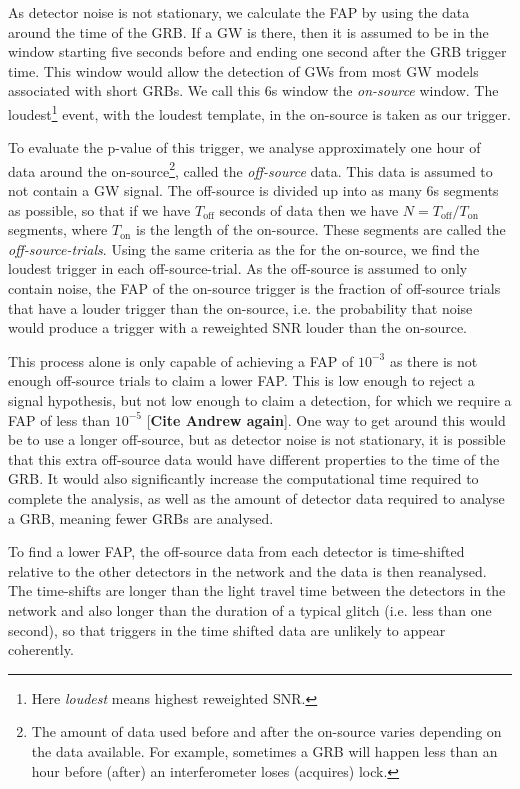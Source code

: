 \documentclass[11pt]{cuthesis}
\begin{document}
As detector noise is not stationary, we calculate the FAP by using the data around the time of the GRB. If a GW is there, then it is assumed to be in the window starting five seconds before and ending one second after the GRB trigger time. This window would allow the detection of GWs from most GW models associated with short GRBs. We call this 6s window the \textit{on-source} window. The loudest\footnote{Here \textit{loudest} means highest reweighted SNR.} event, with the loudest template, in the on-source is taken as our trigger. 

To evaluate the p-value of this trigger, we analyse approximately one hour of data around the on-source\footnote{The amount of data used before and after the on-source varies depending on the data available. For example, sometimes a GRB will happen less than an hour before (after) an interferometer loses (acquires) lock.}, called the \textit{off-source} data. This data is assumed to not contain a GW signal. The off-source is divided up into as many 6s segments as possible, so that if we have $T_\text{off}$ seconds of data then we have $N=T_\text{off} / T_\text{on}$ segments, where $T_\text{on}$ is the length of the on-source. These segments are called the \textit{off-source-trials}. Using the same criteria as the for the on-source, we find the loudest trigger in each off-source-trial. As the off-source is assumed to only contain noise, the FAP of the on-source trigger is the fraction of off-source trials that have a louder trigger than the on-source, i.e. the probability that noise would produce a trigger with a reweighted SNR louder than the on-source. 

This process alone is only capable of achieving a FAP of $10^{-3}$ as there is not enough off-source trials to claim a lower FAP. This is low enough to reject a signal hypothesis, but not low enough to claim a detection, for which we require a FAP of less than $10^{-5}$ [\textbf{Cite Andrew again}]. One way to get around this would be to use a longer off-source, but as detector noise is not stationary, it is possible that this extra off-source data would have different properties to the time of the GRB. It would also significantly increase the computational time required to complete the analysis, as well as the amount of detector data required to analyse a GRB, meaning fewer GRBs are analysed.

To find a lower FAP, the off-source data from each detector is time-shifted relative to the other detectors in the network and the data is then reanalysed. The time-shifts are longer than the light travel time between the detectors in the network and also longer than the duration of a typical glitch (i.e. less than one second), so that triggers in the time shifted data are unlikely to appear coherently.  
\end{document}
